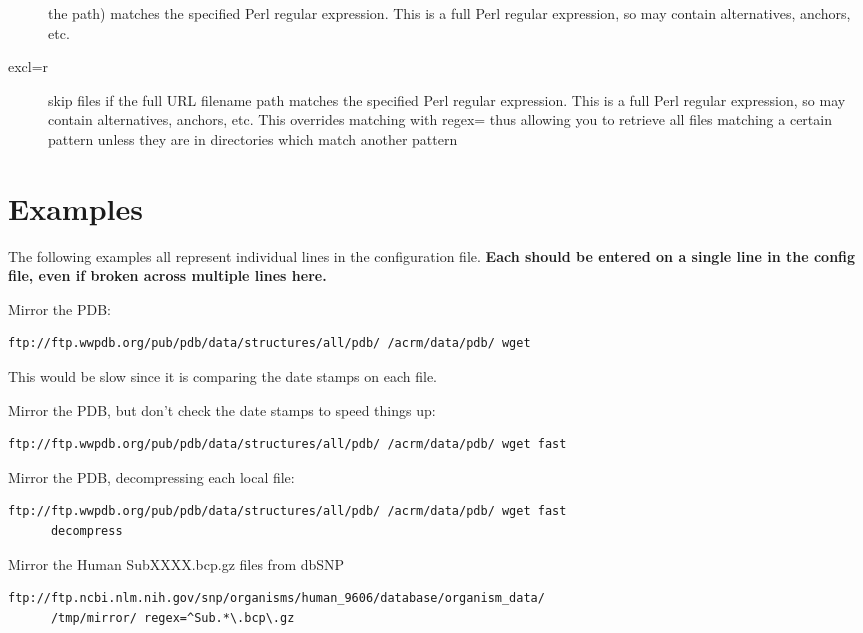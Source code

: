 \documentclass{article}
\begin{document}
\begin{description}
                  the path) matches the specified Perl regular
                  expression. This is a full Perl regular expression,
                  so may contain alternatives, anchors, etc.
\item[excl=r]     skip files if the full URL filename path matches the
                  specified Perl regular expression. This is a full
                  Perl regular expression, so may contain
                  alternatives, anchors, etc. This overrides matching
                  with regex= thus allowing you to retrieve all files
                  matching a certain pattern unless they are in 
                  directories which match another pattern
                  
\end{description}

\section{Examples}
The following examples all represent individual lines in the
 configuration file. {\bfseries Each should be entered on a single
 line in the config file, even if broken across multiple lines here.}
\vspace{1em}

\noindent Mirror the PDB:
{\footnotesize
\begin{verbatim}
ftp://ftp.wwpdb.org/pub/pdb/data/structures/all/pdb/ /acrm/data/pdb/ wget
\end{verbatim}
}
This would be slow since it is comparing the date stamps on each
file.
\vspace{1em}

\noindent Mirror the PDB, but don't check the date stamps to speed things up:
{\footnotesize
\begin{verbatim}
ftp://ftp.wwpdb.org/pub/pdb/data/structures/all/pdb/ /acrm/data/pdb/ wget fast
\end{verbatim}
}
\vspace{1em}

\noindent Mirror the PDB, decompressing each local file:
{\footnotesize
\begin{verbatim}
ftp://ftp.wwpdb.org/pub/pdb/data/structures/all/pdb/ /acrm/data/pdb/ wget fast 
      decompress
\end{verbatim}
}
\vspace{1em}

\noindent Mirror the Human SubXXXX.bcp.gz files from dbSNP
{\footnotesize
\begin{verbatim}
ftp://ftp.ncbi.nlm.nih.gov/snp/organisms/human_9606/database/organism_data/ 
      /tmp/mirror/ regex=^Sub.*\.bcp\.gz
\end{verbatim}
}
\vspace{1em}
\end{document}
